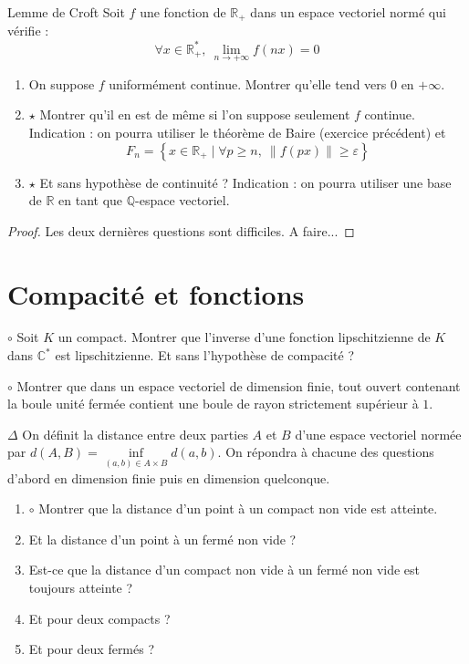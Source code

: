 \documentclass[french,a4paper]{article}
\newcommand{\Q}{\mathbb{Q}}
\newcommand{\R}{\mathbb{R}}
\newcommand{\C}{\mathbb{C}}
\newcommand{\st}{^*}
\theoremstyle{plain}
\theoremstyle{definition}
\theoremstyle{remark}
\begin{document}
\begin{ex}{Lemme de Croft}
	Soit $f$ une fonction de $\R_+$ dans un espace vectoriel normé qui vérifie : $$\forall x\in\R_+\st,\ \lim_{n\to+\infty}f(nx)=0$$
	\begin{enumerate}
		\item On suppose $f$ uniformément continue. Montrer qu'elle tend vers $0$ en $+\infty$.
		\item $\star$ Montrer qu'il en est de même si l'on suppose seulement $f$ continue. Indication : on pourra utiliser le théorème de Baire (exercice précédent) et $$F_n=\left\{x\in\R_+\mid \forall p\geqslant n,\ \lVert f(px)\rVert\geqslant\varepsilon\right\}$$
		\item $\star$ Et sans hypothèse de continuité ? Indication : on pourra utiliser une base de $\R$ en tant que $\Q$-espace vectoriel. 
	\end{enumerate}
\end{ex}
\begin{proof}
	Les deux dernières questions sont difficiles. A faire...
\end{proof}

\section{Compacité et fonctions}

\begin{ex}{$\circ$}
	Soit $K$ un compact. Montrer que l'inverse d'une fonction lipschitzienne de $K$ dans $\C\st$ est lipschitzienne. Et sans l'hypothèse de compacité ?
\end{ex}

\begin{ex}{$\circ$}
	Montrer que dans un espace vectoriel de dimension finie, tout ouvert contenant la boule unité fermée contient une boule de rayon strictement supérieur à $1$.
\end{ex}

\begin{ex}{$\Delta$}
	On définit la distance entre deux parties $A$ et $B$ d'une espace vectoriel normée par $d(A,B)=\displaystyle\underset{(a,b)\in A\times B}{\inf}d(a,b)$. On répondra à chacune des questions d'abord en dimension finie puis en dimension quelconque.
	\begin{enumerate}
		\item $\circ$ Montrer que la distance d'un point à un compact non vide est atteinte.
		\item Et la distance d'un point à un fermé non vide ?
		\item Est-ce que la distance d'un compact non vide à un fermé non vide est toujours atteinte ?
		\item Et pour deux compacts ?
		\item Et pour deux fermés ?
	\end{enumerate}
\end{ex}
\end{document}
